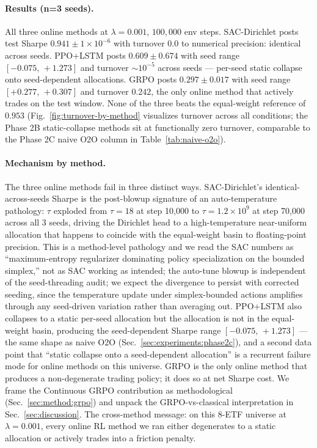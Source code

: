 \paragraph{Results (n=3 seeds).} All three online methods at
$\lambda{=}0.001$, $100{,}000$ env steps. SAC-Dirichlet posts test
Sharpe $0.941 \pm 1\!\times\!10^{-6}$ with turnover $0.0$ to numerical
precision: identical across seeds. PPO+LSTM posts $0.609 \pm 0.674$
with seed range $[-0.075,\,+1.273]$ and turnover $\sim\!10^{-5}$
across seeds --- per-seed static collapse onto seed-dependent
allocations. GRPO posts $0.297 \pm 0.017$ with seed range
$[+0.277,\,+0.307]$ and turnover $0.242$, the only online method that
actively trades on the test window. None of the three beats the
equal-weight reference of $0.953$
(Fig.~\ref{fig:turnover-by-method} visualizes turnover across all
conditions; the Phase 2B static-collapse methods sit at functionally
zero turnover, comparable to the Phase 2C naive O2O column in
Table~\ref{tab:naive-o2o}).

\paragraph{Mechanism by method.} The three online methods fail in
three distinct ways. SAC-Dirichlet's identical-across-seeds Sharpe is
the post-blowup signature of an auto-temperature pathology: $\tau$
exploded from $\tau{=}18$ at step 10{,}000 to $\tau{=}1.2 \times 10^9$
at step 70{,}000 across all 3 seeds, driving the Dirichlet head to a
high-temperature near-uniform allocation that happens to coincide with
the equal-weight basin to floating-point precision. This is a method-level pathology and we read the SAC
numbers as ``maximum-entropy regularizer dominating policy
specialization on the bounded simplex,'' not as SAC working as
intended; the auto-tune blowup is independent of the seed-threading
audit; we expect the divergence to persist with corrected seeding,
since the temperature update under simplex-bounded actions amplifies
through any seed-driven variation rather than averaging out.
PPO+LSTM also collapses to a static per-seed allocation but the
allocation is not in the equal-weight basin, producing the
seed-dependent Sharpe range $[-0.075,\,+1.273]$ --- the same
shape as naive O2O (Sec.~\ref{sec:experiments:phase2c}), and a second
data point that ``static collapse onto a seed-dependent allocation''
is a recurrent failure mode for online methods on this universe. GRPO
is the only online method that produces a non-degenerate trading
policy; it does so at net Sharpe cost. We frame the Continuous GRPO
contribution as methodological (Sec.~\ref{sec:method:grpo}) and unpack
the GRPO-vs-classical interpretation in Sec.~\ref{sec:discussion}.
The cross-method message: on this 8-ETF universe at $\lambda{=}0.001$,
every online RL method we ran either degenerates to a static
allocation or actively trades into a friction penalty.

